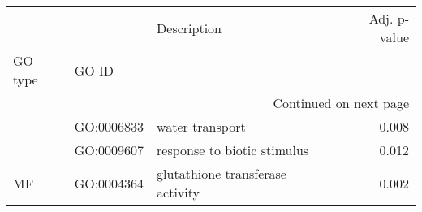\begin{longtable}{lllr}
\toprule
   &            &                       Description &  Adj. p-value \\
GO type & GO ID &                                   &               \\
\midrule
\endhead
\midrule
\multicolumn{4}{r}{{Continued on next page}} \\
\midrule
\endfoot

\bottomrule
\endlastfoot
\multirow{2}{*}{BP} & GO:0006833 &                   water transport &         0.008 \\
   & GO:0009607 &       response to biotic stimulus &         0.012 \\
\cline{1-4}
MF & GO:0004364 &  glutathione transferase activity &         0.002 \\
\end{longtable}
